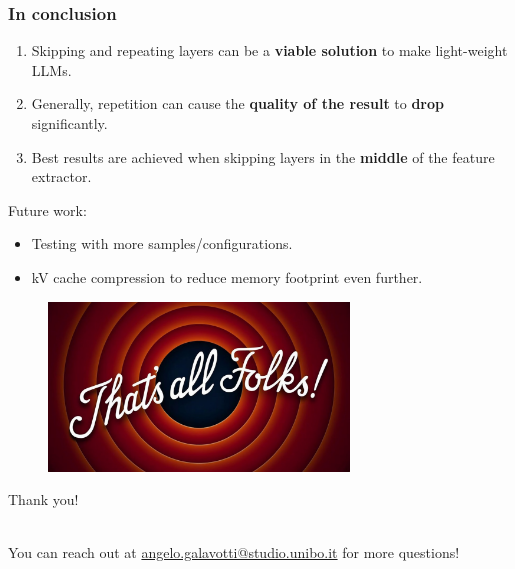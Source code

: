 \documentclass{beamer}
\begin{document}
\begin{frame}
  \frametitle{In conclusion}
  \begin{enumerate}
    \item Skipping and repeating layers can be a \textbf{viable solution} to make light-weight LLMs.
    \item Generally, repetition can cause the \textbf{quality of the result} to \textbf{drop} significantly.
    \item Best results are achieved when skipping layers in the \textbf{middle} of the feature extractor.
  \end{enumerate}
  Future work:
  \begin{itemize}
    \item Testing with more samples/configurations.
    \item kV cache compression to reduce memory footprint even further.
  \end{itemize}
\end{frame}
\begin{frame}

  \begin{figure}[t]
    \includegraphics[width=8cm]{images/ending.png}
    \centering
    \end{figure}

    \vspace{0.2cm}


  \begin{center}
    \begin{Large}
      Thank you!
    \end{Large}
    \\ You can reach out at \url{angelo.galavotti@studio.unibo.it} for more questions!
  \end{center}
\end{frame}
\end{document}
